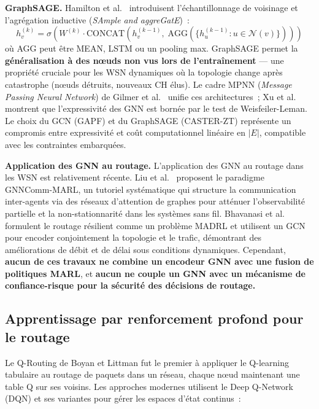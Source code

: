 \textbf{GraphSAGE.} Hamilton et al.\ \cite{hamilton2017graphsage} introduisent l'échantillonnage de voisinage et l'agrégation inductive (\emph{SAmple and aggreGatE})~:
\begin{equation}
    h_v^{(k)} = \sigma\!\left(W^{(k)} \cdot \text{CONCAT}\!\left(h_v^{(k-1)},\; \text{AGG}\!\left(\{h_u^{(k-1)} : u \in \mathcal{N}(v)\}\right)\right)\right)
\end{equation}
où AGG peut être MEAN, LSTM ou un pooling max. GraphSAGE permet la \textbf{généralisation à des n\oe{}uds non vus lors de l'entraînement} --- une propriété cruciale pour les WSN dynamiques où la topologie change après catastrophe (n\oe{}uds détruits, nouveaux CH élus). Le cadre MPNN (\emph{Message Passing Neural Network}) de Gilmer et al.\ \cite{gilmer2017mpnn} unifie ces architectures~; Xu et al.\ \cite{xu2019gin} montrent que l'expressivité des GNN est bornée par le test de Weisfeiler-Leman. Le choix du GCN (GAPF) et du GraphSAGE (CASTER-ZT) représente un compromis entre expressivité et coût computationnel linéaire en $|E|$, compatible avec les contraintes embarquées.

\textbf{Application des GNN au routage.} L'application des GNN au routage dans les WSN est relativement récente. Liu et al.\ \cite{liu2024gnncomm} proposent le paradigme GNNComm-MARL, un tutoriel systématique qui structure la communication inter-agents via des réseaux d'attention de graphes pour atténuer l'observabilité partielle et la non-stationnarité dans les systèmes sans fil. Bhavanasi et al.\ \cite{bhavanasi2023resilient} formulent le routage résilient comme un problème MADRL et utilisent un GCN pour encoder conjointement la topologie et le trafic, démontrant des améliorations de débit et de délai sous conditions dynamiques. Cependant, \textbf{aucun de ces travaux ne combine un encodeur GNN avec une fusion de politiques MARL}, et \textbf{aucun ne couple un GNN avec un mécanisme de confiance-risque pour la sécurité des décisions de routage.}

\subsection{Apprentissage par renforcement profond pour le routage}

Le Q-Routing de Boyan et Littman \cite{boyan1994packet} fut le premier à appliquer le Q-learning tabulaire au routage de paquets dans un réseau, chaque n\oe{}ud maintenant une table Q sur ses voisins. Les approches modernes utilisent le Deep Q-Network (DQN) \cite{mnih2015dqn} et ses variantes pour gérer les espaces d'état continus~:

